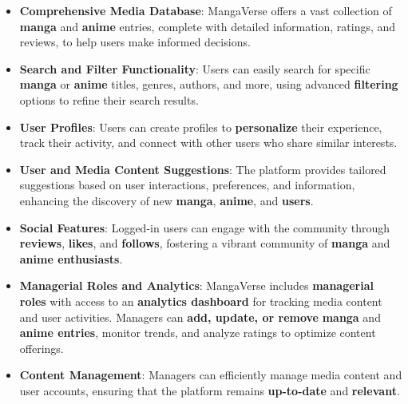 \begin{itemize}
    \item \textbf{Comprehensive Media Database}: MangaVerse offers a vast collection of \textbf{manga} and \textbf{anime} entries,
    complete with detailed information, ratings, and reviews, to help users make informed decisions.

    \item \textbf{Search and Filter Functionality}: Users can easily search for specific \textbf{manga} or \textbf{anime} titles,
    genres, authors, and more, using advanced \textbf{filtering} options to refine their search results.
    
    \item \textbf{User Profiles}: Users can create profiles to \textbf{personalize} their experience, track their activity,
    and connect with other users who share similar interests.

    \item \textbf{User and Media Content Suggestions}: The platform provides tailored suggestions based on user interactions, preferences, 
    and information, enhancing the discovery of new \textbf{manga}, \textbf{anime}, and \textbf{users}.
    
    \item \textbf{Social Features}: Logged-in users can engage with the community through \textbf{reviews}, \textbf{likes}, and \textbf{follows},
    fostering a vibrant community of \textbf{manga} and \textbf{anime enthusiasts}.
    
    \item \textbf{Managerial Roles and Analytics}: MangaVerse includes \textbf{managerial roles} with access to an \textbf{analytics dashboard} 
    for tracking media content and user activities. Managers can \textbf{add, update, or remove} \textbf{manga} and \textbf{anime entries}, monitor trends, 
    and analyze ratings to optimize content offerings.
    
    \item \textbf{Content Management}: Managers can efficiently manage media content and user accounts, 
    ensuring that the platform remains \textbf{up-to-date} and \textbf{relevant}.
\end{itemize}